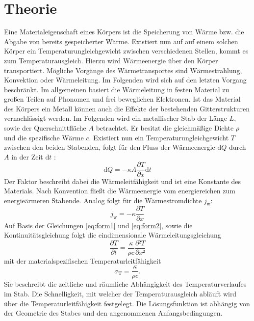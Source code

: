 
\section{Theorie}
\label{sec:Theorie}
Eine Materialeigenschaft eines Körpers ist die Speicherung von Wärme bzw. die Abgabe
 von bereits gespeicherter Wärme. Existiert nun auf auf einem solchen Körper
 ein Temperaturungleichgewicht zwischen verschiedenen Stellen, kommt es zum Temperaturausgleich.
 Hierzu wird Wärmeenergie über den Körper transportiert.
Mögliche Vorgänge des Wärmetransportes sind Wärmestrahlung, Konvektion oder
  Wärmeleitung. Im Folgenden wird sich auf den letzten Vorgang beschränkt. Im
  allgemeinen basiert die Wärmeleitung in festen Material zu großen Teilen auf Phonomen und
   frei beweglichen Elektronen. Ist das Material des Körpers ein Metall können auch die Effekte der
    bestehenden Gitterstrukturen vernachlässigt werden. Im Folgenden wird ein metallischer Stab der
    Länge $L$, sowie der Querschnittfläche $A$ betrachtet. Er besitzt die
    gleichmäßige Dichte $\rho$ und die spezifische Wärme $c$. Existiert nun ein
    Temperaturungleichgewicht $T$ zwischen den beiden Stabenden, folgt für den Fluss
     der Wärmeenergie $\text{d}Q$ durch $A$ in der Zeit $\text{d}t$ :
     \begin{equation}
       \text{d}Q = -\kappa A \frac{\partial T}{\partial x} \text{d}t \label{eq:form1}
       \end{equation}
       Der Faktor \kappa beschreibt dabei die Wärmeleitfähigkeit und ist eine
        Konstante des Materials. Nach Konvention fließt die Wärmeenergie vom
         energiereichen zum energieärmeren Stabende. Analog folgt für die Wärmestromdichte $j_\text{w}$:
         \begin{equation}
           j_\text{w} = -\kappa \frac{\partial T}{\partial x} \label{eq:form2}
           \end{equation}
           Auf Basis der Gleichungen \ref{eq:form1} und \ref{eq:form2}, sowie die Kontinuitätsgleichung folgt
            die eindimensionale Wärmeleitungsgleichung
            \begin{equation}
              \frac{\partial T}{\partial t} = \frac{\kappa}{\rho c}\frac{\partial² T}{\partial x²}\label{eq:form3}
              \end{equation}
              mit der materialspezifischen Temperaturleitfähigkeit
              \begin{equation}
                \sigma_\text{T} = \frac{\kappa}{\rho c}\text{.}
                \end{equation}
             Sie beschreibt
             die zeitliche und räumliche Abhängigkeit des Temperaturverlaufes im Stab.
             Die Schnelligkeit, mit welcher der Temperaturausgleich abläuft wird
             über die Temperaturleitfähigkeit festgelegt. Die Lösungsfunktion ist abhängig
             von der Geometrie des Stabes und den angenommenen Anfangsbedingungen.

